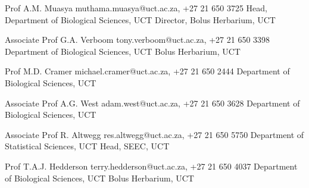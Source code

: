 \documentclass[10pt]{article}
\begin{document}
\begin{hangparas}{2em}{1}

{\small

Prof A.M. Muasya         \hfill muthama.muasya@uct.ac.za, +27 21 650 3725 \break
Head, Department of Biological Sciences, UCT \break
Director, Bolus Herbarium, UCT

Associate Prof G.A. Verboom
                           \hfill tony.verboom@uct.ac.za, +27 21 650 3398 \break
Department of Biological Sciences, UCT \break
Bolus Herbarium, UCT

Prof M.D. Cramer         \hfill michael.cramer@uct.ac.za, +27 21 650 2444 \break
Department of Biological Sciences, UCT

Associate Prof A.G. West      \hfill adam.west@uct.ac.za, +27 21 650 3628 \break
Department of Biological Sciences, UCT

Associate Prof R. Altwegg   \hfill res.altwegg@uct.ac.za, +27 21 650 5750 \break
Department of Statistical Sciences, UCT \break
Head, SEEC, UCT

Prof T.A.J. Hedderson   \hfill terry.hedderson@uct.ac.za, +27 21 650 4037 \break
Department of Biological Sciences, UCT \break
Bolus Herbarium, UCT

}

\end{hangparas}

\bigskip

\hrulefill
\end{document}
